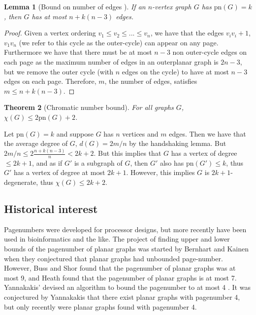 \documentclass[]{report}
\newcommand{\pn}{\text{pn}}
\newtheorem{theorem}{Theorem}
\newtheorem{lemma}[theorem]{Lemma}
\theoremstyle{definition}
\numberwithin{theorem}{section}
\numberwithin{equation}{section}
\begin{document}
\begin{lemma}[Bound on number of edges \cite{bernhartBookThicknessGraph1979}]\label{lem:Edge_Bound}
	If an $n$-vertex graph $G$ has $\pn(G) = k$, then $G$ has at most $n + k(n-3)$ edges.
\end{lemma}
\begin{proof}
	Given a vertex ordering $v_1 \leq v_2 \leq ... \leq v_n$, we have that the edges $v_i v_i+1$, $v_1 v_n$ (we refer to this cycle as the outer-cycle) can appear on any page. Furthermore we have that there must be at most $n-3$ non outer-cycle edges on each page as the maximum number of edges in an outerplanar graph is $2n - 3$, but we remove the outer cycle (with $n$ edges on the cycle) to have at most $n-3$ edges on each page. Therefore, $m$, the number of edges, satisfies $m \leq n + k (n - 3)$. 
\end{proof}
\begin{theorem}[Chromatic number bound\cite{bernhartBookThicknessGraph1979}]\label{thm:Colouring_Bound}
	For all graphs $G$, $\chi(G) \leq 2 \pn(G) + 2$.
\end{theorem}
Let $\pn(G) = k$ and suppose $G$ has $n$ vertices and $m$ edges. Then we have that the average degree of $G$, $d(G) = 2m/n$ by the handshaking lemma. But $2m/n \leq 2 \frac{n + k(n-3)}{n} < 2k + 2$. But this implies that $G$ has a vertex of degree $\leq 2k + 1$, and as if $G'$ is a subgraph of $G$, then $G'$ also has $\pn(G') \leq k$, thus $G'$ has a vertex of degree at most $2k + 1$. However, this implies $G$ is $2k + 1$-degenerate, thus $\chi(G) \leq 2k + 2$. 

\subsection{Historical interest}\label{ssec:Pagenumber_History}
Pagenumbers were developed for processor designs, but more recently have been used in bioinformatics and the like. 
The project of finding upper and lower bounds of the pagenumber of planar graphs was started by Bernhart and Kainen when they conjectured that planar graphs had unbounded page-number. However, Buss and Shor\cite{bussPagenumberPlanarGraphs1984} found that the pagenumber of planar graphs was at most 9, and Heath \cite{heathEmbeddingPlanarGraphs1984} found that the pagenumber of planar graphs is at most 7. Yannakakis' devised an algorithm to bound the pagenumber to at most 4 \cite{yannakakisEmbeddingPlanarGraphs1989b}. It was conjectured by Yannakakis that there exist planar graphs with pagenumber 4, but only recently were planar graphs found with pagenumber 4\cite{yannakakisPlanarGraphsThat2020}\cite{bekosFourPagesAre2020}. 
\end{document}
